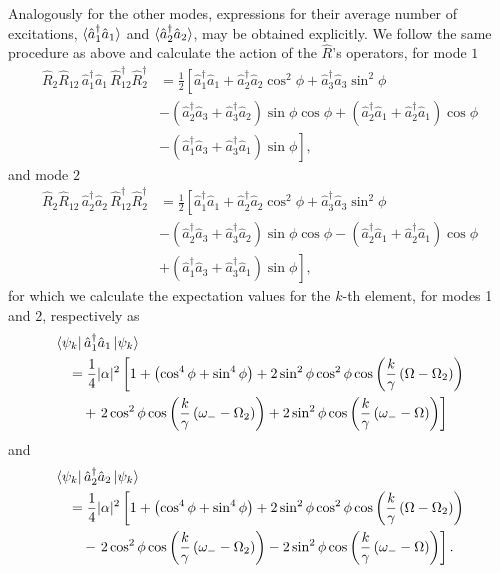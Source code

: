 \documentclass{article}
\newcommand{\op}[1]{\hat{#1}}
\begin{document}
Analogously for the  other modes, expressions for their average number of excitations,  $\braket{\op{a}_{1}^{\dagger}\op{a}_{1}}$ and $\braket{\op{a}_{2}^{\dagger}\op{a}_{2}}$, may be obtained explicitly. We  follow the same procedure as above and  calculate the action of the $\op{R}$'s operators, for mode $1$
\begin{align*}
    \op{R}_{2}\op{R}_{12}\,\op{a}_{1}^{\dagger}\op{a}_{1}\,\op{R}_{12}^{\dagger}\op{R}_{2}^{\dagger} &= \frac{1}{2}\left[\op{a}_{1}^{\dagger}\op{a}_{1} + \op{a}_{2}^{\dagger}\op{a}_{2}\cos^{2}\phi + \op{a}_{3}^{\dagger}\op{a}_{3}\sin^{2}\phi\right.\\ &\left.-\left(\op{a}_{2}^{\dagger}\op{a}_{3} + \op{a}_{3}^{\dagger}\op{a}_{2}\right)\sin\phi\cos\phi
    +\left(\op{a}_{2}^{\dagger}\op{a}_{1} + \op{a}_{2}^{\dagger}\op{a}_{1}\right)\cos\phi\right.\\ &\left.-\left(\op{a}_{1}^{\dagger}\op{a}_{3} + \op{a}_{3}^{\dagger}\op{a}_{1}\right)\sin\phi\right],
\end{align*}
and mode $2$
\begin{align*}
    \op{R}_{2}\op{R}_{12}\,\op{a}_{2}^{\dagger}\op{a}_{2}\,\op{R}_{12}^{\dagger}\op{R}_{2}^{\dagger} &= \frac{1}{2}\left[\op{a}_{1}^{\dagger}\op{a}_{1} + \op{a}_{2}^{\dagger}\op{a}_{2}\cos^{2}\phi + \op{a}_{3}^{\dagger}\op{a}_{3}\sin^{2}\phi\right.\\ &\left.-\left(\op{a}_{2}^{\dagger}\op{a}_{3} + \op{a}_{3}^{\dagger}\op{a}_{2}\right)\sin\phi\cos\phi
    -\left(\op{a}_{2}^{\dagger}\op{a}_{1} + \op{a}_{2}^{\dagger}\op{a}_{1}\right)\cos\phi\right.\\ &\left.+\left(\op{a}_{1}^{\dagger}\op{a}_{3} + \op{a}_{3}^{\dagger}\op{a}_{1}\right)\sin\phi\right],
\end{align*}
for which we calculate the expectation values for the $k$-th element, for modes 1 and 2, respectively as
\begin{align*}
    &\bra{\psi_{k}}\op{a}_{1}^{\dagger}\op{a}_{1}\ket{\psi_{k}}\\ 
    &\quad= \frac{1}{4}|\alpha|^{2}\left[1 + \left(\cos^{4}\phi + \sin^{4}\phi\right) + 2\sin^{2}\phi\cos^{2}\phi\cos\left(\frac{k}{\gamma}\left(\Omega-\Omega_{2}\right)\right)\right.\\
    &\qquad + \left.2\cos^{2}\phi\cos\left(\frac{k}{\gamma}\left(\omega_{-}-\Omega_{2}\right)\right)+ 2\sin^{2}\phi\cos\left(\frac{k}{\gamma}\left(\omega_{-}-\Omega\right)\right)\right]
\end{align*}
and
\begin{align*}
    &\bra{\psi_{k}}\op{a}_{2}^{\dagger}\op{a}_{2}\ket{\psi_{k}}\\
    &\quad= \frac{1}{4}|\alpha|^{2}\left[1 + \left(\cos^{4}\phi + \sin^{4}\phi\right) + 2\sin^{2}\phi\cos^{2}\phi\cos\left(\frac{k}{\gamma}\left(\Omega-\Omega_{2}\right)\right)\right.\\
    &\qquad - \left.2\cos^{2}\phi\cos\left(\frac{k}{\gamma}\left(\omega_{-}-\Omega_{2}\right)\right)- 2\sin^{2}\phi\cos\left(\frac{k}{\gamma}\left(\omega_{-}-\Omega\right)\right)\right].
\end{align*}
\end{document}
